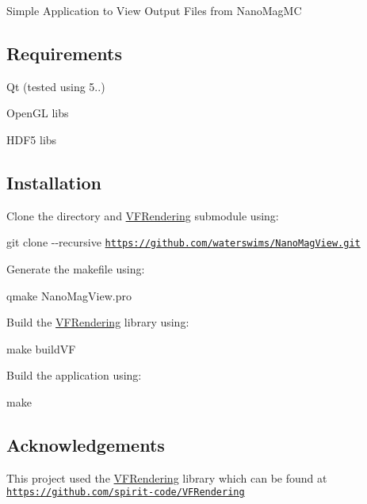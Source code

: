 Simple Application to View Output Files from Nano\+Mag\+MC

\subsection*{Requirements}


\begin{DoxyItemize}
\item Qt (tested using 5..)
\item Open\+GL libs
\item H\+D\+F5 libs
\end{DoxyItemize}

\subsection*{Installation}


\begin{DoxyItemize}
\item Clone the directory and \hyperlink{namespaceVFRendering}{V\+F\+Rendering} submodule using\+:
\end{DoxyItemize}

{\ttfamily git clone -\/-\/recursive \href{https://github.com/waterswims/NanoMagView.git}{\tt https\+://github.\+com/waterswims/\+Nano\+Mag\+View.\+git}}


\begin{DoxyItemize}
\item Generate the makefile using\+:
\end{DoxyItemize}

{\ttfamily qmake Nano\+Mag\+View.\+pro}


\begin{DoxyItemize}
\item Build the \hyperlink{namespaceVFRendering}{V\+F\+Rendering} library using\+:
\end{DoxyItemize}

{\ttfamily make build\+VF}


\begin{DoxyItemize}
\item Build the application using\+:
\end{DoxyItemize}

{\ttfamily make}

\subsection*{Acknowledgements}

This project used the \hyperlink{namespaceVFRendering}{V\+F\+Rendering} library which can be found at \href{https://github.com/spirit-code/VFRendering}{\tt https\+://github.\+com/spirit-\/code/\+V\+F\+Rendering} 